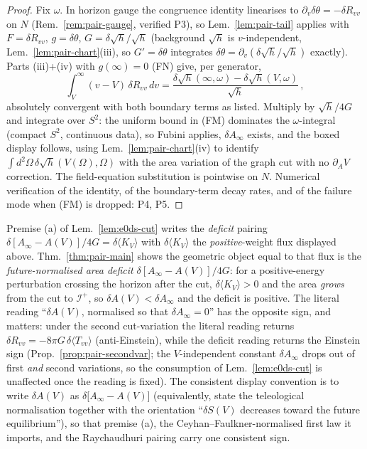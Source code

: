 \begin{proof}
Fix $\omega$. In horizon gauge the congruence identity linearises to
$\partial_{v}\delta\theta=-\delta R_{vv}$ on $N$
(Rem.~\ref{rem:pair-gauge}, verified P3), so
Lem.~\ref{lem:pair-tail} applies with $F=\delta R_{vv}$,
$g=\delta\theta$, $G=\delta\sqrt h/\sqrt h$ (background $\sqrt h$ is
$v$-independent, Lem.~\ref{lem:pair-chart}(iii), so
$G'=\delta\theta$ integrates $\delta\theta=\partial_{v}(\delta\sqrt
h/\sqrt h)$ exactly). Parts (iii)+(iv) with $g(\infty)=0$ (FN) give,
per generator,
\[
\int_{V}^{\infty}(v-V)\,\delta R_{vv}\,dv
=\frac{\delta\sqrt h(\infty,\omega)-\delta\sqrt h(V,\omega)}
{\sqrt h}\,,
\]
absolutely convergent with both boundary terms as listed. Multiply by
$\sqrt h/4G$ and integrate over $S^{2}$: the uniform bound in (FM)
dominates the $\omega$-integral (compact $S^{2}$, continuous data), so
Fubini applies, $\delta A_{\infty}$ exists, and the boxed display
follows, using Lem.~\ref{lem:pair-chart}(iv) to identify
$\int d^{2}\Omega\,\delta\sqrt h(V(\Omega),\Omega)$ with the area
variation of the graph cut with no $\partial_{A}V$ correction. The
field-equation substitution is pointwise on $N$. Numerical
verification of the identity, of the boundary-term decay rates, and
of the failure mode when (FM) is dropped: P4, P5.
\end{proof}

\begin{remark}
\label{rem:pair-sign}
Premise (a) of Lem.~\ref{lem:e0ds-cut} writes the
\emph{deficit} pairing $\delta[A_{\infty}-A(V)]/4G
=\delta\langle K_{V}\rangle$ with
$\delta\langle K_{V}\rangle$ the \emph{positive}-weight flux
displayed above. Thm.~\ref{thm:pair-main} shows the geometric object
equal to that flux is the \emph{future-normalised area deficit}
$\delta[A_{\infty}-A(V)]/4G$: for a positive-energy perturbation
crossing the horizon after the cut, $\delta\langle K_{V}\rangle>0$
and the area \emph{grows} from the cut to $\mathscr{I}^{+}$, so
$\delta A(V)<\delta A_{\infty}$ and the deficit is positive. The
literal reading ``$\delta A(V)$, normalised so that
$\delta A_{\infty}=0$'' has the opposite sign, and matters: under the
second cut-variation the literal reading returns
$\delta R_{vv}=-8\pi G\,\delta\langle T_{vv}\rangle$
(anti-Einstein), while the deficit reading returns the Einstein sign
(Prop.~\ref{prop:pair-secondvar}; the $V$-independent constant
$\delta A_{\infty}$ drops out of first \emph{and} second variations,
so the consumption of Lem.~\ref{lem:e0ds-cut} is unaffected once the
reading is fixed). The consistent display convention is to write
$\delta A(V)$ as $\delta\bigl[A_{\infty}-A(V)\bigr]$ (equivalently,
state the teleological normalisation together with the orientation
``$\delta S(V)$ decreases toward the future equilibrium''), so that
premise (a), the Ceyhan--Faulkner-normalised first law it imports,
and the Raychaudhuri pairing carry one consistent sign.
\end{remark}

